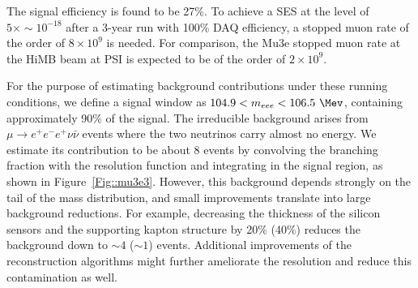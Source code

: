 The signal efficiency is found to be 27\%. To achieve a SES at the level of $5\times\sim 10^{-18}$ after a 3-year run with 100\% DAQ efficiency, a stopped muon rate of the order of $8\times 10^{9}$ is needed. For comparison, the Mu3e stopped muon rate at the HiMB beam at PSI is expected to be of the order of $2\times 10^{9}$.   

For the purpose of estimating background contributions under these running conditions, we define a signal window as $ 104.9 < m_{eee} < 106.5 ~\Mev$, containing approximately 90\% of the signal. The irreducible background arises from $\mu \rightarrow e^+e^-e^+ \nu\bar\nu$ events where the two neutrinos carry almost no energy. We estimate its contribution to be about 8 events by convolving the branching fraction with the resolution function and integrating in the signal region, as shown in Figure~\ref{Fig::mu3e3}. However, this background depends strongly on the tail of the mass distribution, and small improvements translate into large background reductions. For example, decreasing the thickness of the silicon sensors and the supporting kapton structure by 20\% (40\%) reduces the background down to $\sim 4$ ($\sim 1$) events. Additional improvements of the reconstruction algorithms might further ameliorate the resolution and reduce this contamination as well.


